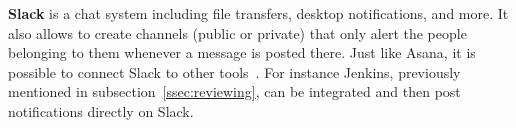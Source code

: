 \textbf{Slack} is a chat system including file transfers, desktop notifications, and more. It also allows to create channels (public or private) that only alert the people belonging to them whenever a message is posted there. Just like Asana, it is possible to connect Slack to other tools~\cite{slack}. For instance Jenkins, previously mentioned in {\sc subsection}~\ref{ssec:reviewing}, can be integrated and then post notifications directly on Slack.
